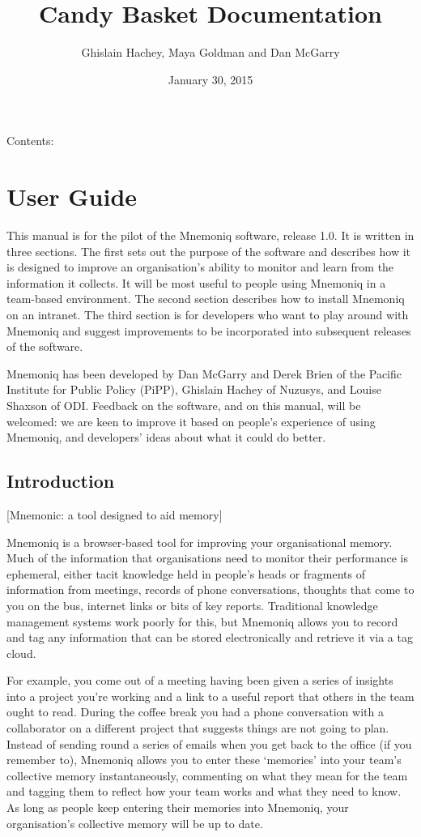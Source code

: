 \documentclass[letterpaper,10pt,english]{sphinxmanual}
\title{Candy Basket Documentation}
\date{January 30, 2015}
\author{Ghislain Hachey, Maya Goldman and Dan McGarry}
\begin{document}
\maketitle
\tableofcontents
{}\label{index::doc}


Contents:


\chapter{User Guide}
\label{user-guide:user-guide}\label{user-guide:candy-basket-s-documentation}\label{user-guide::doc}
This manual is for the pilot of the Mnemoniq software, release 1.0.
It is written in three sections.  The first sets out the purpose of
the software and describes how it is designed to improve an
organisation's ability to monitor and learn from the information it
collects.  It will be most useful to people using Mnemoniq in a
team-based environment.  The second section describes how to install
Mnemoniq on an intranet.  The third section is for developers who want
to play around with Mnemoniq and suggest improvements to be
incorporated into subsequent releases of the software.

Mnemoniq has been developed by Dan McGarry and Derek Brien of the
Pacific Institute for Public Policy (PiPP), Ghislain Hachey of
Nuzusys, and Louise Shaxson of ODI.  Feedback on the software, and on
this manual, will be welcomed: we are keen to improve it based on
people's experience of using Mnemoniq, and developers' ideas about
what it could do better.


\section{Introduction}
\label{user-guide:introduction}
{[}Mnemonic: a tool designed to aid memory{]}

Mnemoniq is a browser-based tool for improving your organisational
memory. Much of the information that organisations need to monitor
their performance is ephemeral, either tacit knowledge held in
people's heads or fragments of information from meetings, records of
phone conversations, thoughts that come to you on the bus, internet
links or bits of key reports.  Traditional knowledge management
systems work poorly for this, but Mnemoniq allows you to record and
tag any information that can be stored electronically and retrieve it
via a tag cloud.

For example, you come out of a meeting having been given a series of
insights into a project you're working and a link to a useful report
that others in the team ought to read. During the coffee break you had
a phone conversation with a collaborator on a different project that
suggests things are not going to plan.  Instead of sending round a
series of emails when you get back to the office (if you remember to),
Mnemoniq allows you to enter these `memories' into your team's
collective memory instantaneously, commenting on what they mean for
the team and tagging them to reflect how your team works and what they
need to know.  As long as people keep entering their memories into
Mnemoniq, your organisation's collective memory will be up to date.
\end{document}
